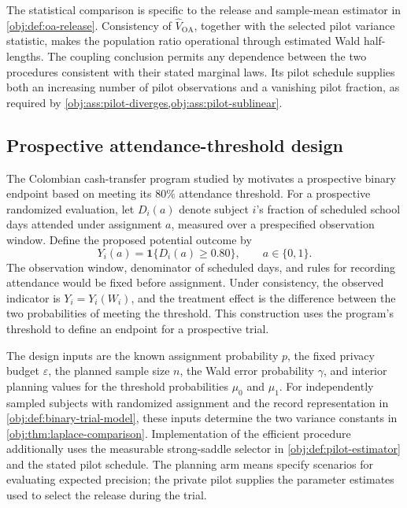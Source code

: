The statistical comparison is specific to the release and sample-mean estimator in \cref{obj:def:oa-release}. Consistency of \(\widehat V_{\mathrm{OA}}\), together with the selected pilot variance statistic, makes the population ratio operational through estimated Wald half-lengths. The coupling conclusion permits any dependence between the two procedures consistent with their stated marginal laws. Its pilot schedule supplies both an increasing number of pilot observations and a vanishing pilot fraction, as required by \cref{obj:ass:pilot-diverges,obj:ass:pilot-sublinear}.

\subsection{Prospective attendance-threshold design}

The Colombian cash-transfer program studied by \citet{BarreraOsorioEtAl2011} motivates a prospective binary endpoint based on meeting its \(80\%\) attendance threshold. For a prospective randomized evaluation, let \(D_i(a)\) denote subject \(i\)'s fraction of scheduled school days attended under assignment \(a\), measured over a prespecified observation window. Define the proposed potential outcome by
\[
Y_i(a)=\mathbf 1\{D_i(a)\ge 0.80\},
\qquad a\in\{0,1\}.
\]
The observation window, denominator of scheduled days, and rules for recording attendance would be fixed before assignment. Under consistency, the observed indicator is \(Y_i=Y_i(W_i)\), and the treatment effect is the difference between the two probabilities of meeting the threshold. This construction uses the program's threshold to define an endpoint for a prospective trial.

The design inputs are the known assignment probability \(p\), the fixed privacy budget \(\varepsilon\), the planned sample size \(n\), the Wald error probability \(\gamma\), and interior planning values for the threshold probabilities \(\mu_0\) and \(\mu_1\). For independently sampled subjects with randomized assignment and the record representation in \cref{obj:def:binary-trial-model}, these inputs determine the two variance constants in \cref{obj:thm:laplace-comparison}. Implementation of the efficient procedure additionally uses the measurable strong-saddle selector in \cref{obj:def:pilot-estimator} and the stated pilot schedule. The planning arm means specify scenarios for evaluating expected precision; the private pilot supplies the parameter estimates used to select the release during the trial.

